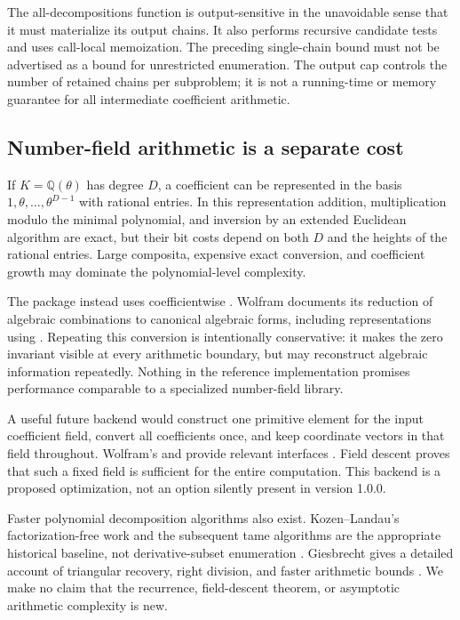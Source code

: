 \documentclass[11pt,a4paper]{article}
\theoremstyle{definition}
\newcommand{\Q}{\mathbb Q}
\newcommand{\code}[1]{\texttt{\detokenize{#1}}}
\begin{document}
The all-decompositions function is output-sensitive in the unavoidable sense that it must materialize its output chains. It also performs recursive candidate tests and uses call-local memoization. The preceding single-chain bound must not be advertised as a bound for unrestricted enumeration. The output cap controls the number of retained chains per subproblem; it is not a running-time or memory guarantee for all intermediate coefficient arithmetic.

\subsection{Number-field arithmetic is a separate cost}
If $K=\Q(\theta)$ has degree $D$, a coefficient can be represented in the basis $1,\theta,\ldots,\theta^{D-1}$ with rational entries. In this representation addition, multiplication modulo the minimal polynomial, and inversion by an extended Euclidean algorithm are exact, but their bit costs depend on both $D$ and the heights of the rational entries. Large composita, expensive exact conversion, and coefficient growth may dominate the polynomial-level complexity.

The package instead uses coefficientwise \code{RootReduce}. Wolfram documents its reduction of algebraic combinations to canonical algebraic forms, including representations using \code{Root} \cite{rootreduce}. Repeating this conversion is intentionally conservative: it makes the zero invariant visible at every arithmetic boundary, but may reconstruct algebraic information repeatedly. Nothing in the reference implementation promises performance comparable to a specialized number-field library.

A useful future backend would construct one primitive element for the input coefficient field, convert all coefficients once, and keep coordinate vectors in that field throughout. Wolfram's \code{ToNumberField} and \code{AlgebraicNumber} provide relevant interfaces \cite{tonumberfield,algebraicnumber}. Field descent proves that such a fixed field is sufficient for the entire computation. This backend is a proposed optimization, not an option silently present in version 1.0.0.

Faster polynomial decomposition algorithms also exist. Kozen--Landau's factorization-free work and the subsequent tame algorithms are the appropriate historical baseline, not derivative-subset enumeration \cite{kozenlandau,gathen}. Giesbrecht gives a detailed account of triangular recovery, right division, and faster arithmetic bounds \cite{giesbrecht}. We make no claim that the recurrence, field-descent theorem, or asymptotic arithmetic complexity is new.
\end{document}
